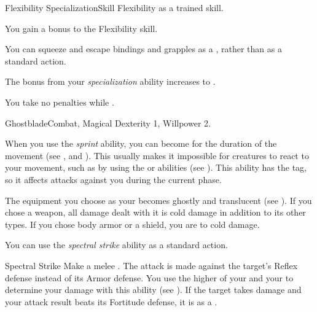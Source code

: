     \begin{feat}{Flexibility Specialization}{Skill}
        \featpre Flexibility as a trained skill.

         You gain a  bonus to the Flexibility skill.

         You can squeeze and escape bindings and grapples as a , rather than as a standard action.

         The bonus from your \textit{specialization} ability increases to .

         You take no penalties while \squeezing.
    \end{feat}

    \begin{magicalfeat}{Ghostblade}{Combat, Magical}
        \featpre Dexterity 1, Willpower 2.

         When you use the \textit{sprint} ability, you can become  for the duration of the movement (see , and ).
        This usually makes it impossible for creatures to react to your movement, such as by using the  or  abilities (see ).
        This ability has the  tag, so it affects attacks against you during the current phase.

         The equipment you choose as your  becomes ghostly and translucent (see ).
        If you chose a weapon, all damage dealt with it is cold damage in addition to its other types.
        If you chose body armor or a shield, you are  to cold damage.

         You can use the \textit{spectral strike} ability as a standard action.
        \begin{magicalactiveability}{Spectral Strike}
            \rankline
            Make a melee .
            The attack is made against the target's Reflex defense instead of its Armor defense.
            You use the higher of your  and your  to determine your damage with this ability (see ).
            If the target takes damage and your attack result beats its Fortitude defense, it is \slowed as a .


\end{magicalactiveability}
\end{magicalfeat}
